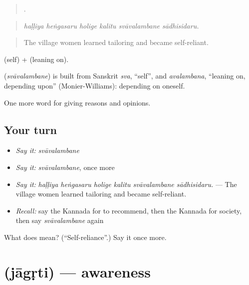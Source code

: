 \begin{quote}
     .
\end{quote}

\begin{quote}
\emph{haḷḷiya heṅgasaru holige kalitu svāvalambane sādhisidaru.}
\end{quote}

\begin{quote}
The village women learned tailoring and became self-reliant.
\end{quote}

 (self) +  (leaning on).

\begin{cousinweb}
\textbf{} (\emph{svāvalambane}) is built from Sanskrit \emph{sva}, \textquotedblleft{}self\textquotedblright{}, and \emph{avalambana}, \textquotedblleft{}leaning on, depending upon\textquotedblright{} (Monier-Williams): depending on oneself.
\end{cousinweb}

\begin{grammarlens}[title={What you've built}]
One more word for giving reasons and opinions.
\end{grammarlens}

\subsection*{Your turn}
\begin{itemize}
\raggedright
  \item \emph{Say it:} \emph{svāvalambane}
  \item \emph{Say it:} \emph{svāvalambane}, once more
  \item \emph{Say it:} \emph{haḷḷiya heṅgasaru holige kalitu svāvalambane sādhisidaru.} — The village women learned tailoring and became self-reliant.
  \item \emph{Recall:} say the Kannada for to recommend, then the Kannada for society, then say \emph{svāvalambane} again
\end{itemize}

\begin{tcolorbox}[breakable,colback=teal!4,colframe=teal!35!black,title={Before you move on}]
What does  mean? (\textquotedblleft{}Self-reliance\textquotedblright{}.) Say it once more.
\end{tcolorbox}
\section[\texorpdfstring{\kn{ಜಾಗೃತಿ} (jāgṛti)}{ಜಾಗೃತಿ (jāgṛti)}]{ (jāgṛti) — awareness}


